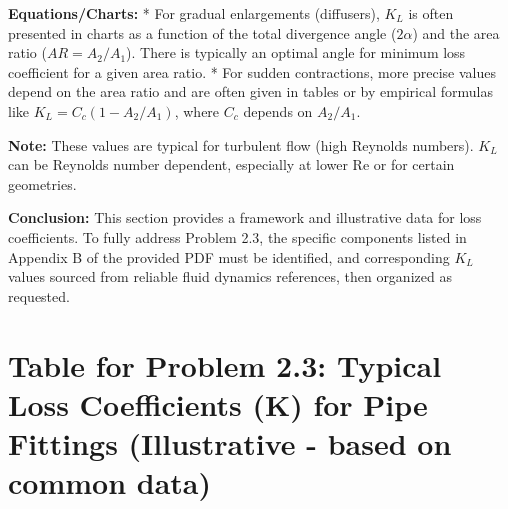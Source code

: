 \textbf{Equations/Charts:} * For gradual enlargements (diffusers),
\(K_L\) is often presented in charts as a function of the total
divergence angle (\(2\alpha\)) and the area ratio (\(AR = A_2/A_1\)).
There is typically an optimal angle for minimum loss coefficient for a
given area ratio. * For sudden contractions, more precise values depend
on the area ratio and are often given in tables or by empirical formulas
like \(K_L = C_c (1 - A_2/A_1)\), where \(C_c\) depends on \(A_2/A_1\).

\textbf{Note:} These values are typical for turbulent flow (high
Reynolds numbers). \(K_L\) can be Reynolds number dependent, especially
at lower Re or for certain geometries.

\textbf{Conclusion:} This section provides a framework and illustrative
data for loss coefficients. To fully address Problem 2.3, the specific
components listed in Appendix B of the provided PDF must be identified,
and corresponding \(K_L\) values sourced from reliable fluid dynamics
references, then organized as requested.

\hypertarget{table-for-problem-2.3-typical-loss-coefficients-k-for-pipe-fittings-illustrative---based-on-common-data}{%
\section{Table for Problem 2.3: Typical Loss Coefficients (K) for Pipe
Fittings (Illustrative - based on common
data)}\label{table-for-problem-2.3-typical-loss-coefficients-k-for-pipe-fittings-illustrative---based-on-common-data}}

